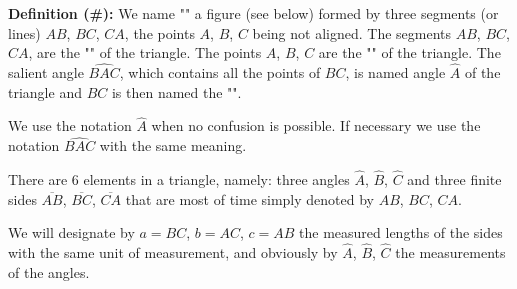 	\textbf{Definition (\#\mydef):} We name "" a figure (see below) formed by three segments (or lines) $AB$, $BC$, $CA$, the points $A$, $B$, $C$ being not aligned. The segments $AB$, $BC$, $CA$, are the "" of the triangle. The points $A$, $B$, $C$ are the "" of the triangle. The salient angle $\widehat{BAC}$, which contains all the points of $BC$, is named angle $\hat{A}$ of the triangle and $BC$ is then named the "".
	
	\begin{tcolorbox}[title=Remark,colframe=black,arc=10pt]
	We use the notation $\hat{A}$ when no confusion is possible. If necessary we use the notation $\widehat{BAC}$ with the same meaning.
	\end{tcolorbox}
	There are $6$ elements in a triangle, namely: three angles $\hat{A}$,  $\hat{B}$,  $\hat{C}$ and three finite sides $\overline{AB}$, $\overline{BC}$, $\overline{CA}$ that are most of time simply denoted by $AB$, $BC$, $CA$.

	We will designate by $a=BC$, $b=AC$, $c=AB$ the measured lengths of the sides with the same unit of measurement, and obviously by $\hat{A}$,  $\hat{B}$,  $\hat{C}$ the measurements of the angles.

